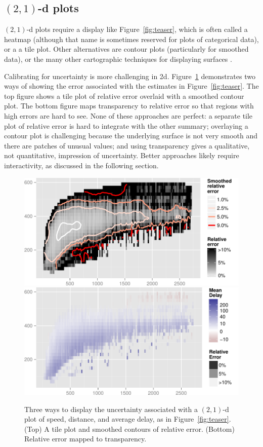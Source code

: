 \documentclass[journal]{vgtc}                %
\begin{document}
\subsection{\texorpdfstring{$(2,1)$}{(2, 1)}-d plots}
\label{sub:2d-plots}

$(2, 1)$-d plots require a display like Figure~\ref{fig:teaser}, which is often called a heatmap \citep{wilkinson:2009} (although that name is sometimes reserved for plots of categorical data), or a a tile plot. Other alternatives are contour plots (particularly for smoothed data), or the many other cartographic techniques for displaying surfaces \citep{kennelly:2002}.

Calibrating for uncertainty is more challenging in 2d. Figure~\ref{fig:2d-error} demonstrates two ways of showing the error associated with the estimates in Figure~\ref{fig:teaser}. The top figure shows a tile plot of relative error overlaid with a smoothed contour plot. The bottom figure maps transparency to relative error so that regions with high errors are hard to see. None of these approaches are perfect: a separate tile plot of relative error is hard to integrate with the other summary; overlaying a contour plot is challenging because the underlying surface is not very smooth and there are patches of unusual values; and using transparency gives a qualitative, not quantitative, impression of uncertainty. Better approaches likely require interactivity, as discussed in the following section.

\begin{figure}
  \centering
   \includegraphics[width=0.8\linewidth]{2d-error}
   \includegraphics[width=0.8\linewidth]{2d-alpha}
 \caption{Three ways to display the uncertainty associated with a $(2,1)$-d plot of speed, distance, and average delay, as in Figure~\ref{fig:teaser}. (Top) A tile plot and smoothed contours of relative error. (Bottom) Relative error mapped to transparency.}
 \label{fig:2d-error}
\end{figure}
\end{document}
